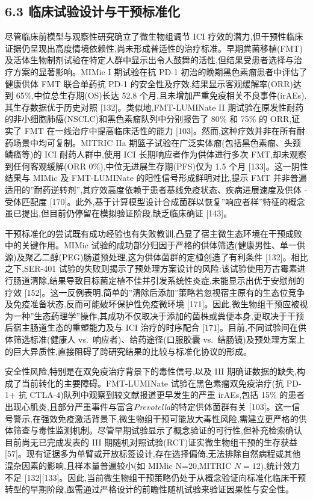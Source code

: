 \subsection{6.3 临床试验设计与干预标准化}\label{ux4e34ux5e8aux8bd5ux9a8cux8bbeux8ba1ux4e0eux5e72ux9884ux6807ux51c6ux5316}

尽管临床前模型与观察性研究确立了微生物组调节 ICI 疗效的潜力,但干预性临床证据仍呈现出高度情境依赖性,尚未形成普适性的治疗标准。早期粪菌移植(FMT)及活体生物制剂试验在特定人群中显示出令人鼓舞的活性,但结果受患者选择与治疗方案的显著影响。MIMic I 期试验在抗 PD-1 初治的晚期黑色素瘤患者中评估了健康供体 FMT 联合单药抗 PD-1 的安全性及疗效,结果显示客观缓解率(ORR)达到 65\%,中位总生存期(OS)长达 52.8 个月,且未增加严重免疫相关不良事件(irAEs),其生存数据优于历史对照 {[}132{]}。类似地,FMT-LUMINate II 期试验在原发性耐药的非小细胞肺癌(NSCLC)和黑色素瘤队列中分别报告了 80\% 和 75\% 的 ORR,证实了 FMT 在一线治疗中提高临床活性的能力 {[}103{]}。然而,这种疗效并非在所有耐药场景中均可复制。MITRIC IIa 期篮子试验在广泛实体瘤(包括黑色素瘤、头颈鳞癌等)的 ICI 耐药人群中,使用 ICI 长期响应者作为供体进行多次 FMT,却未观察到任何客观缓解(ORR 0\%),中位无进展生存期(PFS)仅为 1.5 个月 {[}133{]}。这一阴性结果与 MIMic 及 FMT-LUMINate 的阳性信号形成鲜明对比,提示 FMT 并非普遍适用的''耐药逆转剂'',其疗效高度依赖于患者基线免疫状态、疾病进展速度及供体 - 受体匹配度 {[}170{]}。此外,基于计算模型设计合成菌群以恢复''响应者样''特征的概念虽已提出,但目前仍停留在模拟验证阶段,缺乏临床确证 {[}143{]}。

干预标准化的尝试既有成功经验也有失败教训,凸显了宿主微生态环境在干预成败中的关键作用。MIMic 试验的成功部分归因于严格的供体筛选(健康男性、单一供源)及聚乙二醇(PEG)肠道预处理,这为供体菌群的定植创造了有利条件 {[}132{]}。相比之下,SER-401 试验的失败则揭示了预处理方案设计的风险:该试验使用万古霉素进行肠道清除,结果导致目标菌定植不佳并引发系统性炎症,未能显示出优于安慰剂的疗效 {[}152{]}。这一反例表明,简单的''清除后添加''策略若忽视宿主原有的生态位竞争及免疫准备状态,反而可能破坏保护性免疫微环境 {[}171{]}。因此,微生物组干预应被视为一种''生态药理学''操作,其成功不仅取决于添加的菌株或粪便本身,更取决于干预后宿主肠道生态的重塑能力及与 ICI 治疗的时序配合 {[}171{]}。目前,不同试验间在供体筛选标准(健康人 vs.~响应者)、给药途径(口服胶囊 vs.~结肠镜)及预处理方案上的巨大异质性,直接阻碍了跨研究结果的比较与标准化协议的形成。

安全性风险,特别是在双免疫治疗背景下的毒性信号,以及 III 期确证数据的缺失,构成了当前转化的主要障碍。FMT-LUMINate 试验在黑色素瘤双免疫治疗(抗 PD-1+ 抗 CTLA-4)队列中观察到较文献报道更早发生的严重 irAEs,包括 15\% 的患者出现心肌炎,且部分严重事件与富含\emph{Prevotella}的特定供体菌群有关 {[}103{]}。这一信号警示,在强效免疫激活背景下,微生物组干预可能放大毒性风险,需建立更严格的供体筛查与毒性监测机制。尽管早期试验显示了概念验证的可行性,但补充检索确认目前尚无已完成发表的 III 期随机对照试验(RCT)证实微生物组干预的生存获益 {[}57{]}。现有证据多为单臂或开放标签设计,存在选择偏倚,无法排除自然病程或其他混杂因素的影响,且样本量普遍较小(如 MIMic N=20,MITRIC \(N=12)\),统计效力不足 {[}132{]}{[}133{]}。因此,当前微生物组干预策略仍处于从概念验证向标准化临床干预转型的早期阶段,亟需通过严格设计的前瞻性随机试验来验证因果性与安全性。

